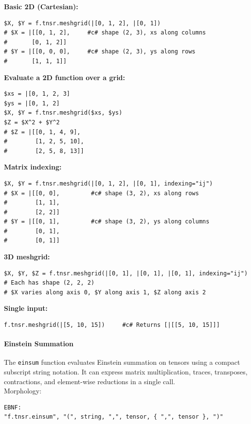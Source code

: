 \textbf{Basic 2D (Cartesian):}
\begin{verbatim}
$X, $Y = f.tnsr.meshgrid(|[0, 1, 2], |[0, 1])
# $X = |[[0, 1, 2],     #c# shape (2, 3), xs along columns
#       [0, 1, 2]]
# $Y = |[[0, 0, 0],     #c# shape (2, 3), ys along rows
#       [1, 1, 1]]
\end{verbatim}

\textbf{Evaluate a 2D function over a grid:}
\begin{verbatim}
$xs = |[0, 1, 2, 3]
$ys = |[0, 1, 2]
$X, $Y = f.tnsr.meshgrid($xs, $ys)
$Z = $X^2 + $Y^2
# $Z = |[[0, 1, 4, 9],
#        [1, 2, 5, 10],
#        [2, 5, 8, 13]]
\end{verbatim}

\textbf{Matrix indexing:}
\begin{verbatim}
$X, $Y = f.tnsr.meshgrid(|[0, 1, 2], |[0, 1], indexing="ij")
# $X = |[[0, 0],         #c# shape (3, 2), xs along rows
#        [1, 1],
#        [2, 2]]
# $Y = |[[0, 1],         #c# shape (3, 2), ys along columns
#        [0, 1],
#        [0, 1]]
\end{verbatim}

\textbf{3D meshgrid:}
\begin{verbatim}
$X, $Y, $Z = f.tnsr.meshgrid(|[0, 1], |[0, 1], |[0, 1], indexing="ij")
# Each has shape (2, 2, 2)
# $X varies along axis 0, $Y along axis 1, $Z along axis 2
\end{verbatim}

\textbf{Single input:}
\begin{verbatim}
f.tnsr.meshgrid(|[5, 10, 15])     #c# Returns [|[[5, 10, 15]]]
\end{verbatim}

\paragraph{Einstein Summation}
The \texttt{einsum} function evaluates Einstein summation on tensors using a compact subscript string notation. It can express matrix multiplication, traces, transposes, contractions, and element-wise reductions in a single call.\\
Morphology:
\begin{verbatim}
EBNF:
"f.tnsr.einsum", "(", string, ",", tensor, { ",", tensor }, ")"
\end{verbatim}

